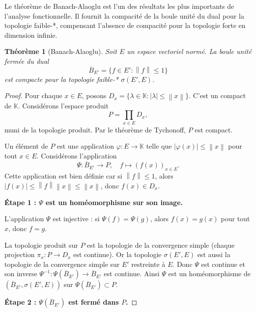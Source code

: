 \documentclass[a4paper,12pt]{book}
\newcommand{\K}{\mathbb{K}}
\newcommand{\norm}[1]{\left\| #1 \right\|}
\newcommand{\abs}[1]{\left| #1 \right|}
\theoremstyle{definition}
\theoremstyle{plain}
\newtheorem{theoreme}[definition]{Théorème}
\theoremstyle{remark}
\begin{document}

Le théorème de Banach-Alaoglu est l'un des résultats les plus importants de l'analyse
fonctionnelle. Il fournit la compacité de la boule unité du dual pour la topologie
faible-*, compensant l'absence de compacité pour la topologie forte en dimension infinie.

\begin{theoreme}[Banach-Alaoglu]
\label{thm:banach-alaoglu}
Soit $E$ un espace vectoriel normé. La boule unité fermée du dual
\[
  \overline{B}_{E'} = \{ f \in E' : \norm{f} \le 1 \}
\]
est compacte pour la topologie faible-* $\sigma(E', E)$.
\end{theoreme}

\begin{proof}
Pour chaque $x \in E$, posons $D_x = \{ \lambda \in \K : \abs{\lambda} \le \norm{x} \}$.
C'est un compact de $\K$. Considérons l'espace produit
\[
  P = \prod_{x \in E} D_x,
\]
muni de la topologie produit. Par le théorème de
Tychonoff, $P$ est compact.

Un élément de $P$ est une application $\varphi : E \to \K$ telle que
$\abs{\varphi(x)} \le \norm{x}$ pour tout $x \in E$. Considérons l'application
\[
  \Psi : \overline{B}_{E'} \longrightarrow P, \quad f \longmapsto (f(x))_{x \in E}.
\]
Cette application est bien définie car si $\norm{f} \le 1$, alors
$\abs{f(x)} \le \norm{f} \norm{x} \le \norm{x}$, donc $f(x) \in D_x$.

\medskip
\noindent\textbf{Étape 1 : $\Psi$ est un homéomorphisme sur son image.}

L'application $\Psi$ est injective : si $\Psi(f) = \Psi(g)$, alors $f(x) = g(x)$
pour tout $x$, donc $f = g$.

La topologie produit sur $P$ est la topologie de la convergence simple
(chaque projection $\pi_x : P \to D_x$ est continue). Or la topologie $\sigma(E',E)$
est aussi la topologie de la convergence simple sur $E'$ restreinte à $E$. Donc
$\Psi$ est continue et son inverse $\Psi^{-1} : \Psi(\overline{B}_{E'}) \to \overline{B}_{E'}$
est continue. Ainsi $\Psi$ est un homéomorphisme de $(\overline{B}_{E'}, \sigma(E',E))$
sur $\Psi(\overline{B}_{E'}) \subset P$.

\medskip
\noindent\textbf{Étape 2 : $\Psi(\overline{B}_{E'})$ est fermé dans $P$.}


\end{proof}
\end{document}
